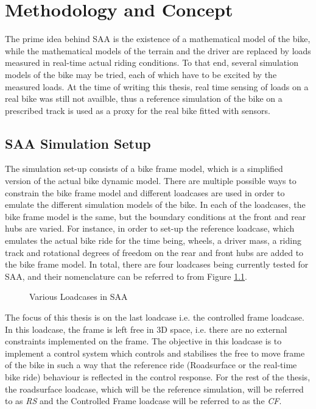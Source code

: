 \changefontsizes{20pt}
\chapter{Methodology and Concept}
\label{cha:kap2}
\changefontsizes{12pt}

The prime idea behind SAA is the existence of a mathematical model of the bike, while the mathematical models of the terrain and the driver are replaced by loads measured in real-time actual riding conditions. To that end, several simulation models of the bike may be tried, each of which have to be excited by the measured loads. At the time of writing this thesis, real time sensing of loads on a real bike was still not availble, thus a reference simulation of the bike on a prescribed track is used as a proxy for the real bike fitted with sensors.
\section{SAA Simulation Setup}
\label{sec:kap2ab1}
The simulation set-up consists of a bike frame model, which is a simplified version of the actual bike dynamic model. There are multiple possible ways to constrain the bike frame model and different loadcases are used in order to emulate the different simulation models of the bike. In each of the loadcases, the bike frame model is the same, but the boundary conditions at the front and rear hubs are varied. For instance, in order to set-up the reference loadcase, which emulates the actual bike ride for the time being, wheels, a driver mass, a riding track and rotational degrees of freedom on the rear and front hubs are added to the bike frame model. In total, there are four loadcases being currently tested for SAA, and their nomenclature can be referred to from Figure \ref{fig:loadcases}.

\begin{figure}[h!]
		
\caption{Various Loadcases in SAA}
\label{fig:loadcases}
\end{figure}

The focus of this thesis is on the last loadcase i.e. the controlled frame loadcase. In this loadcase, the frame is left free in 3D space, i.e. there are no external constraints implemented on the frame. The objective in this loadcase is to implement a control system which controls and stabilises the free to move frame of the bike in such a way that the reference ride (Roadsurface or the real-time bike ride) behaviour is reflected in the control response. For the rest of the thesis, the roadsurface loadcase, which will be the reference simulation, will be referred to as \emph{RS} and the Controlled Frame loadcase will be referred to as the \emph{CF}.

